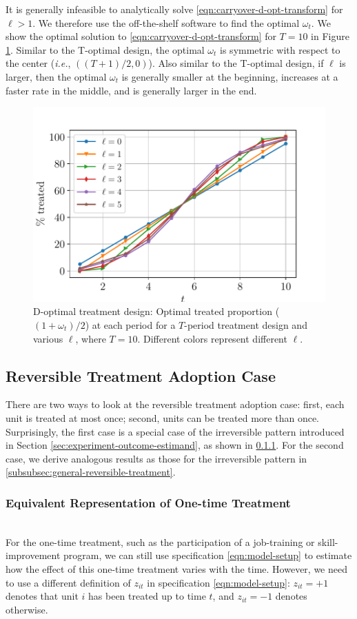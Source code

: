 		It is generally infeasible to analytically solve \eqref{eqn:carryover-d-opt-transform} for $\ell > 1$. We therefore use the off-the-shelf software to find the optimal $\omega_t$. We show the optimal solution to \eqref{eqn:carryover-d-opt-transform} for $T=10$ in Figure \ref{fig:carryover-treatment-effect-d-opt}. Similar to the T-optimal design,  the optimal $\omega_t$ is symmetric with respect to the center ({\it i.e.}, $((T+1)/2,0)$). Also similar to the T-optimal design, if $\ell$ is larger, then the optimal $\omega_t$ is generally smaller at the beginning, increases at a faster rate in the middle, and is generally larger in the end. 
	
		\begin{figure}[t!]
			\centering
			\includegraphics[width=0.5\linewidth]{plots/illustration/carryover-d-optimal.pdf}
			\caption{{D}-optimal treatment design: Optimal treated proportion ($(1+\omega_t)/2$) at each period for a $T$-period treatment design and various $\ell$, where $T = 10$. Different colors represent different $\ell$.}
			\label{fig:carryover-treatment-effect-d-opt}
		\end{figure}
		
		

\subsection{Reversible Treatment Adoption Case}\label{subsec:reversible-treatment}

There are two ways to look at the reversible treatment adoption case: first, each unit is treated at most once; second, units can be treated more than once. Surprisingly, the first case is a special case of the irreversible pattern introduced in Section \ref{sec:experiment-outcome-estimand}, as shown in \ref{subsubsec:one-time-treatment}.  For the second case, we derive analogous results as those for the irreversible pattern in \ref{subsubsec:general-reversible-treatment}.

\subsubsection{Equivalent Representation of One-time Treatment}\label{subsubsec:one-time-treatment}
\texttt{} \\
For the one-time treatment, such as the participation of a job-training or skill-improvement program, we can still use specification \eqref{eqn:model-setup} to estimate how the effect of this one-time treatment varies with the time. However, we need to use a different definition of $z_{it}$ in specification \eqref{eqn:model-setup}: $z_{it} = +1$ denotes that unit $i$ has been treated up to time $t$, and $z_{it} = -1$ denotes otherwise.

